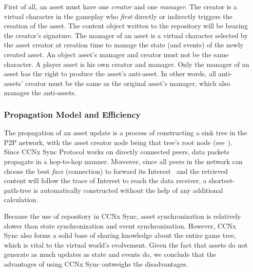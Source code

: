 \documentclass{sigchi}
\begin{document}
First of all, an asset must have one \emph{creator} and one \emph{manager}. The creator is a virtual character in the gameplay who \emph{first} directly or indirectly triggers the creation of the asset. The content object written to the repository will be bearing the creator's signature. The manager of an asset is a virtual character selected by the asset creator at creation time to manage the state (and events) of the newly created asset. An object asset's manager and creator must not be the same character. A player asset is his own creator and manager. Only the manager of an asset has the right to produce the asset's anti-asset. In other words, all anti-assets' creator must be the same as the original asset's manager, which also manages the anti-assets.




\subsubsection{Propagation Model and Efficiency}

The propagation of an asset update is a process of constructing a sink tree in the P2P network, with the asset creator node being that tree's root node (see~). Since CCNx Sync Protocol works on directly connected peers, data packets propagate in a hop-to-hop manner. Moreover, since all peers in the network can choose the best \emph{face} (connection) to forward its Interest~\cite{Jndn} and the retrieved content will follow the trace of Interest to reach the data receiver, a shortest-path-tree is automatically constructed without the help of any additional calculation.

Because the use of repository in CCNx Sync, asset synchronization is relatively slower than state synchronization and event synchronization. However, CCNx Sync also forms a solid base of sharing knowledge about the entire game tree, which is vital to the virtual world's evolvement. Given the fact that assets do not generate as much updates as state and events do, we conclude that the advantages of using CCNx Sync outweighs the disadvantages.
\end{document}
